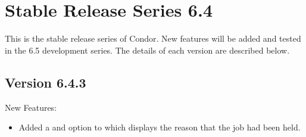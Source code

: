 \section{\label{sec:History-6-4}Stable Release Series 6.4}

This is the stable release series of Condor.
New features will be added and tested in the 6.5 development series. 
The details of each version are described below.
\subsection{\label{sec:New-6-4-3}Version 6.4.3}

\noindent New Features:
\begin{itemize}

\item Added a  and  option to  which 
displays the reason that the job had been held.

\end{itemize}

